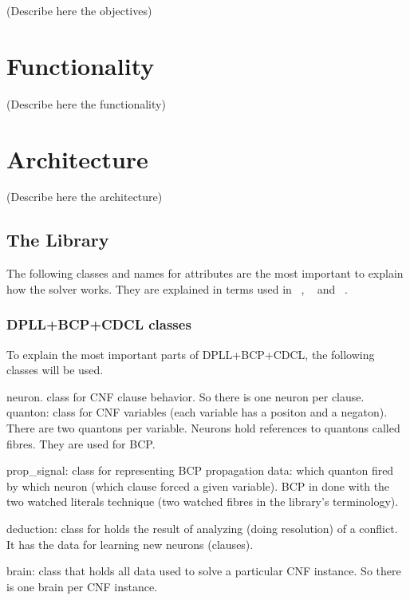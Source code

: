 \documentclass{easychair}
\begin{document}
(Describe here the objectives)

\section{Functionality}
\label{sect:funtionality}

(Describe here the functionality)

\section{Architecture}
\label{sect:architecture}

(Describe here the architecture)

\subsection{The Library}

The following classes and names for attributes are the most important to explain how the solver works. They are explained in terms used in ~\cite{silva-95}, ~\cite{moskewicz-01} and  ~\cite{bastert-02}.

\subsubsection{DPLL+BCP+CDCL classes}

To explain the most important parts of  DPLL+BCP+CDCL, the following classes will be used.

neuron. class for CNF clause behavior. So there is one neuron per clause.
quanton: class for CNF variables (each variable has a positon and a negaton). There are two quantons per variable. Neurons hold references to quantons called fibres. They are used for BCP.

prop\_signal: class for representing BCP propagation data: which quanton fired by which neuron (which clause forced a given variable). BCP in done with the two watched literals technique (two watched fibres in the library's terminology).

deduction: class for holds the result of analyzing (doing resolution) of a conflict. It has the data for learning new neurons (clauses).

brain: class that holds all data used to solve a particular CNF instance. So there is one brain per CNF instance.
\end{document}
